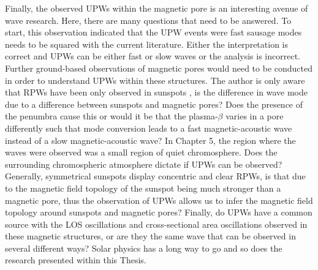 %   
Finally, the observed UPWs within the magnetic pore is an interesting avenue of wave research.
Here, there are many questions that need to be answered.
To start, this observation indicated that the UPW events were fast sausage modes needs to be squared with the current literature.
Either the interpretation is correct and UPWs can be either fast or slow waves or the analysis is incorrect.
Further ground-based observations of magnetic pores would need to be conducted in order to understand UPWs within these structures.
The author is only aware that RPWs have been only observed in sunspots , is the difference in wave mode due to a difference between sunspots and magnetic pores? 
Does the presence of the penumbra cause this or would it be that the plasma-$\beta$ varies in a pore differently such that mode conversion leads to a fast magnetic-acoustic wave instead of a slow magnetic-acoustic wave?
In Chapter 5, the region where the waves were observed was a small region of quiet chromosphere.
Does the surrounding chromospheric atmosphere dictate if UPWs can be observed?
Generally, symmetrical sunspots display concentric and clear RPWs, is that due to the magnetic field topology of the sunspot being much stronger than a magnetic pore, thus the observation of UPWs allows us to infer the magnetic field topology around sunspots and magnetic pores?
Finally, do UPWs have a common source with the LOS oscillations and cross-sectional area oscillations observed in these magnetic structures, or are they the same wave that can be observed in several different ways?
Solar physics has a long way to go and so does the research presented within this Thesis.